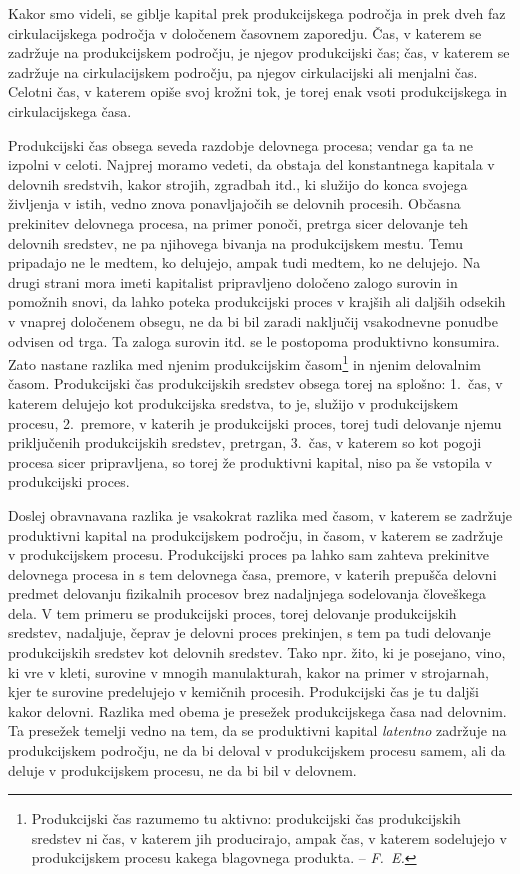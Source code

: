 \documentclass[kapital_02.tex]{subfiles}
\begin{document}
\setcounter{footnote}{8}
Kakor \KPEstran smo videli, se giblje kapital prek produkcijskega področja in prek dveh faz cirkulacijskega področja v določenem časovnem zaporedju. Čas, v katerem se zadržuje na produkcijskem področju, je njegov produkcijski čas; čas, v katerem se zadržuje na cirkulacijskem področju, pa njegov cirkulacijski ali menjalni čas. Celotni čas, v katerem opiše svoj krožni tok, je torej enak vsoti produkcijskega in cirkulacijskega časa.

Produkcijski čas obsega seveda razdobje delovnega procesa; vendar ga ta ne izpolni v celoti. Najprej moramo vedeti, da obstaja del konstantnega kapitala v delovnih sredstvih, kakor strojih, zgradbah itd., ki služijo do konca svojega življenja v istih, vedno znova ponavljajočih se delovnih procesih. Občasna prekinitev delovnega procesa, na primer ponoči, pretrga sicer delovanje teh delovnih sredstev, ne pa njihovega bivanja na produkcijskem mestu. Temu pripadajo ne le medtem, ko delujejo, ampak tudi medtem, ko ne delujejo. Na drugi strani mora imeti kapitalist pripravljeno določeno zalogo surovin in pomožnih snovi, da lahko poteka produkcijski proces v krajših ali daljših odsekih v vnaprej določenem obsegu, ne da bi bil zaradi naključij vsakodnevne ponudbe odvisen od trga. Ta zaloga surovin itd. se le postopoma produktivno konsumira. Zato nastane razlika med njenim produkcijskim časom\footnote{Produkcijski čas razumemo tu aktivno: produkcijski čas produkcijskih sredstev ni čas, v katerem jih producirajo, ampak čas, v katerem sodelujejo v produkcijskem procesu kakega blagovnega produkta. -- \emph{F.\ E.}} in njenim \KPEstran delovalnim časom. Produkcijski čas produkcijskih sredstev obsega torej na splošno: 1.\ čas, v katerem delujejo kot produkcijska sredstva, to je, služijo v produkcijskem procesu, 2.\ premore, v katerih je produkcijski proces, torej tudi delovanje njemu priključenih produkcijskih sredstev, pretrgan, 3.\ čas, v katerem so kot pogoji procesa sicer pripravljena, so torej že produktivni kapital, niso pa še vstopila v produkcijski proces.

Doslej obravnavana razlika je vsakokrat razlika med časom, v katerem se zadržuje produktivni kapital na produkcijskem področju, in časom, v katerem se zadržuje v produkcijskem procesu. Produkcijski proces pa lahko sam zahteva prekinitve delovnega procesa in s tem delovnega časa, premore, v katerih prepušča delovni predmet delovanju fizikalnih procesov brez nadaljnjega sodelovanja človeškega dela. V tem primeru se produkcijski proces, torej delovanje produkcijskih sredstev, nadaljuje, čeprav je delovni proces prekinjen, s tem pa tudi delovanje produkcijskih sredstev kot delovnih sredstev. Tako npr. žito, ki je posejano, vino, ki vre v kleti, surovine v mnogih manulakturah, kakor na primer v strojarnah, kjer te surovine predelujejo v kemičnih procesih. Produkcijski čas je tu daljši kakor delovni. Razlika med obema je presežek produkcijskega časa nad delovnim. Ta presežek temelji vedno na tem, da se produktivni kapital \emph{latentno} zadržuje na produkcijskem področju, ne da bi deloval v produkcijskem procesu samem, ali da deluje v produkcijskem procesu, ne da bi bil v delovnem.
\end{document}
